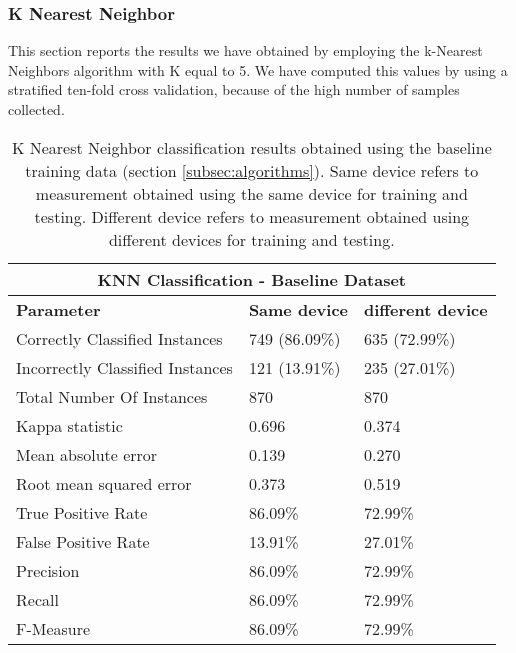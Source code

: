 \subsubsection{K Nearest Neighbor}
This section reports the results we have obtained by employing the k-Nearest Neighbors algorithm with K equal to 5.
We have computed this values by using a stratified ten-fold cross validation, because of the high number of samples collected.

\begin{table}
\center
\caption[K Nearest Neighbor classification results obtained using the baseline training data.]{K Nearest Neighbor classification results obtained using the baseline training data (section \ref{subsec:algorithms}). Same device refers to measurement obtained using the same device for training and testing. Different device refers to measurement obtained using different devices for training and testing.}
\label{tab:knn-baseline}
\begin{tabular}{ |l|l|l| }
  \hline
  \multicolumn{3}{|c|}{\textbf{KNN Classification - Baseline Dataset}} \\
  \hline
  \textbf{Parameter} & \textbf{Same device} & \textbf{different device}\\
  \hline
  Correctly Classified Instances & 749 (86.09\%) & 635 (72.99\%) \\
  Incorrectly Classified Instances & 121 (13.91\%) & 235 (27.01\%) \\
  Total Number Of Instances & 870 & 870 \\
  Kappa statistic & 0.696 & 0.374 \\
  Mean absolute error & 0.139 & 0.270 \\
  Root mean squared error & 0.373 & 0.519 \\
  True Positive Rate & 86.09\% & 72.99\% \\
  False Positive Rate & 13.91\% & 27.01\% \\
  Precision & 86.09\% & 72.99\% \\
  Recall & 86.09\% & 72.99\% \\
  F-Measure & 86.09\% & 72.99\% \\
  \hline
\end{tabular}
\end{table}

